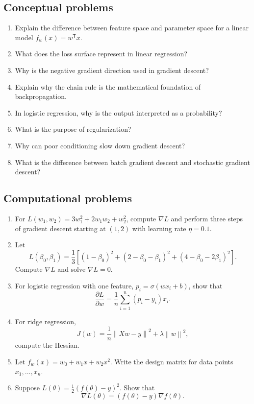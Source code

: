 \documentclass[11pt,oneside]{book}
\newcommand{\grad}{\nabla}
\newcommand{\norm}[1]{\left\lVert #1\right\rVert}
\newcommand{\T}{^{\mathsf T}}
\begin{document}
\subsection*{Conceptual problems}
\begin{enumerate}
  \item Explain the difference between feature space and parameter space for a linear model $f_w(x)=w\T x$.
  \item What does the loss surface represent in linear regression?
  \item Why is the negative gradient direction used in gradient descent?
  \item Explain why the chain rule is the mathematical foundation of backpropagation.
  \item In logistic regression, why is the output interpreted as a probability?
  \item What is the purpose of regularization?
  \item Why can poor conditioning slow down gradient descent?
  \item What is the difference between batch gradient descent and stochastic gradient descent?
\end{enumerate}

\subsection*{Computational problems}
\begin{enumerate}[start=9]
  \item For $L(w_1,w_2)=3w_1^2+2w_1w_2+w_2^2$, compute $\grad L$ and perform three steps of gradient descent starting at $(1,2)$ with learning rate $\eta=0.1$.
  \item Let
  \[
  L(\beta_0,\beta_1)=\frac13\left[(1-\beta_0)^2+(2-\beta_0-\beta_1)^2+(4-\beta_0-2\beta_1)^2\right].
  \]
  Compute $\grad L$ and solve $\grad L=0$.
  \item For logistic regression with one feature, $p_i=\sigma(wx_i+b)$, show that
  \[
  \frac{\partial L}{\partial w}=\frac1n\sum_{i=1}^n(p_i-y_i)x_i.
  \]
  \item For ridge regression,
  \[
  J(w)=\frac1n\norm{Xw-y}^2+\lambda\norm{w}^2,
  \]
  compute the Hessian.
  \item Let $f_w(x)=w_0+w_1x+w_2x^2$. Write the design matrix for data points $x_1,\ldots,x_n$.
  \item Suppose $L(\theta)=\frac12(f(\theta)-y)^2$. Show that
  \[
  \grad L(\theta)=(f(\theta)-y)\grad f(\theta).
  \]
\end{enumerate}
\end{document}
